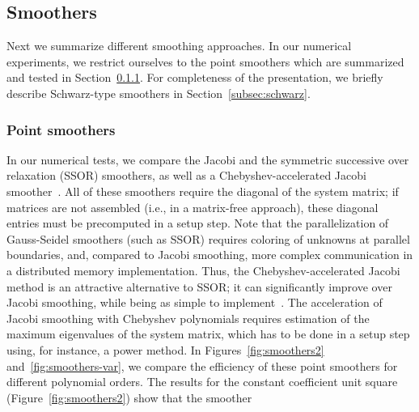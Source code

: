 \documentclass[smallcondensed,final]{svjour3}     %
\begin{document}




\subsection{Smoothers}\label{subsec:smoothers}
Next we summarize different smoothing approaches. In our numerical
experiments, we restrict ourselves to the point smoothers which are
summarized and tested in Section~\ref{subsec:ptsmoothers}. For
completeness of the presentation, we briefly describe Schwarz-type
smoothers in Section~\ref{subsec:schwarz}.


\subsubsection{Point smoothers}\label{subsec:ptsmoothers}
In our numerical tests, we compare the Jacobi and the symmetric
successive over relaxation (SSOR) smoothers, as well as a
Chebyshev-accelerated Jacobi smoother~\cite{Brandt77}. All of these
smoothers require the diagonal of the system matrix; if matrices are
not assembled (i.e., in a matrix-free approach), these diagonal
entries must be precomputed in a setup step.  Note that the
parallelization of Gauss-Seidel smoothers (such as SSOR) requires
coloring of unknowns at parallel boundaries, and, compared to Jacobi
smoothing, more complex communication in a distributed memory
implementation. Thus, the Chebyshev-accelerated Jacobi method is an
attractive alternative to SSOR; it can significantly improve over
Jacobi smoothing, while being as simple to
implement~\cite{AdamsBrezinaHuEtAl03}. The acceleration of Jacobi
smoothing with Chebyshev polynomials requires estimation of the
maximum eigenvalues of the system matrix, which has to be done in a
setup step using, for instance, a power method.  In
Figures~\ref{fig:smoothers2} and~\ref{fig:smoothers-var}, we compare
the efficiency of these point smoothers for different polynomial
orders. The results for the constant coefficient unit square
(Figure~\ref{fig:smoothers2}) show that the smoother
\end{document}

